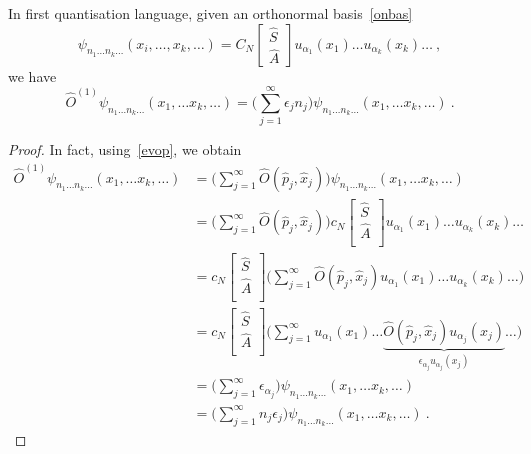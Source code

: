     In first quantisation language, given an orthonormal basis~\eqref{onbas}
    \begin{equation*}
        \psi_{n_1 \ldots n_k \ldots} (x_i, \ldots, x_k, \ldots) = C_N \begin{bmatrix}
            \hat S \\ \hat A
        \end{bmatrix} u_{\alpha_1} (x_1) \ldots u_{\alpha_k}(x_k) \ldots ~,
    \end{equation*}
    we have
    \begin{equation*}
        \hat O^{(1)} \psi_{n_1 \ldots n_k \ldots} (x_1, \ldots x_k, \ldots) = \Big (\sum_{j=1}^{\infty} \epsilon_j n_j \Big ) \psi_{n_1 \ldots n_k \ldots} (x_1, \ldots x_k, \ldots) ~.
    \end{equation*}
    \begin{proof}
    In fact, using~\eqref{evop}, we obtain
    \begin{equation*}
    \begin{aligned}
        \hat O^{(1)} \psi_{n_1 \ldots n_k \ldots} (x_1, \ldots x_k, \ldots) & = \Big ( \sum_{j=1}^{\infty} \hat O(\hat p_j, \hat x_j) \Big) \psi_{n_1 \ldots n_k \ldots} (x_1, \ldots x_k, \ldots) \\ & = \Big ( \sum_{j=1}^{\infty} \hat O(\hat p_j, \hat x_j) \Big) c_N \begin{bmatrix} \hat S \\ \hat A \\ \end{bmatrix} u_{\alpha_1} (x_1) \ldots u_{\alpha_k} (x_k) \ldots \\ & = c_N \begin{bmatrix} \hat S \\ \hat A \\ \end{bmatrix} \Big ( \sum_{j=1}^{\infty} \hat O(\hat p_j, \hat x_j) u_{\alpha_1} (x_1) \ldots u_{\alpha_k} (x_k) \ldots \Big) \\ & = c_N \begin{bmatrix} \hat S \\ \hat A \\ \end{bmatrix} \Big ( \sum_{j=1}^{\infty}  u_{\alpha_1} (x_1) \ldots \underbrace{\hat O(\hat p_j, \hat x_j) u_{\alpha_j} (x_j)}_{\epsilon_{\alpha_j} u_{\alpha_j} (x_j) } \ldots \Big) \\ & = \Big (\sum_{j=1}^{\infty} \epsilon_{\alpha_j} \Big ) \psi_{n_1 \ldots n_k \ldots} (x_1, \ldots x_k, \ldots) \\ & = \Big (\sum_{j=1}^{\infty} n_j \epsilon_j \Big ) \psi_{n_1 \ldots n_k \ldots} (x_1, \ldots x_k, \ldots) ~.
    \end{aligned}
    \end{equation*}
    \end{proof}

